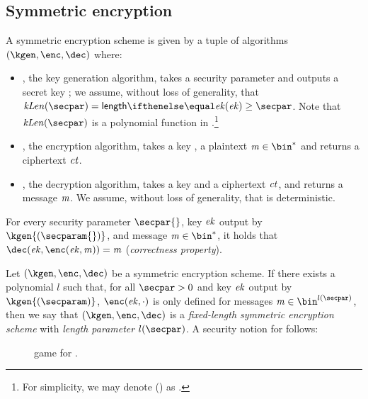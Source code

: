 \subsection{Symmetric encryption}\label{preliminaries:definitions:sym-enc}

\begin{definition}
    A symmetric encryption scheme \sym{} is given by a tuple of \ppt{} algorithms $(\kgen,\enc, \dec)$ where:
\begin{itemize}
    \item \kgen{}, the key generation algorithm, takes a security parameter \secparam{} and outputs a secret key \ek; we assume, without loss of generality, that $\symKeyLen (\secpar) = \len{\ek}\geq \secpar$. Note that $\symKeyLen(\secpar)$ is a polynomial function in \secpar.\footnote{For simplicity, we may denote \symKeyLen(\secpar) as \symKeyLen{}.}
    \item \enc{}, the encryption algorithm, takes a key \ek{}, a plaintext $\msg\in\bin^{*}$ and returns a ciphertext $\mathit{ct}$.
    \item \dec{}, the decryption algorithm, takes a key \ek{} and a ciphertext $\mathit{ct}$, and returns a message $\mathit{m}$. We assume, without loss of generality, that \dec{} is deterministic.
\end{itemize}
    For every security parameter $\secpar{}$, key $\mathit{ek}$ output by $\kgen{(\secparam{})}$, and message $\msg \in \bin^{*}$, it holds that $\dec(\ek, \enc(\ek, \msg)) = \msg$ (\emph{correctness property}).
\end{definition}

Let $(\kgen,\enc, \dec)$ be a symmetric encryption scheme. If there exists a polynomial $l$ such that, for all $\secpar > 0$ and key $\mathit{ek}$ output by $\kgen{(\secparam)}$, $\enc(\ek, \cdot)$ is only defined for messages $\msg\in\bin^{l(\secpar)}$, then we say that $(\kgen,\enc,\dec)$ is a \emph{fixed-length symmetric encryption scheme} with \emph{length parameter} $l(\secpar)$. A security notion for \sym{} follows:

\begin{figure}[h!]
    \centering
    \caption{\indcpa{} game for \sym.}\label{fig:indcpa}
\end{figure}

